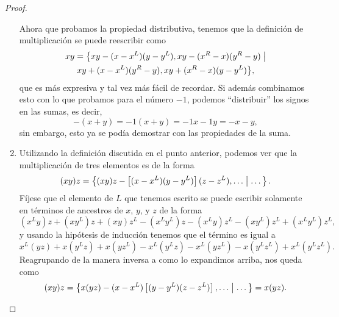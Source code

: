 \begin{proof}
\begin{enumerate}
            Ahora que probamos la propiedad distributiva, tenemos que la definici\'on de multiplicaci\'on se puede reescribir como 
            \begin{multline*}
                xy = \big\{xy-(x-x^L)(y-y^L),xy-(x^R-x)(y^R-y)\;\big|\\
                \break xy+(x-x^L)(y^R-y), xy+(x^R-x)(y-y^L)\big\},
            \end{multline*}
            que es m\'as expresiva y tal vez m\'as f\'acil de recordar. Si adem\'as combinamos esto con lo que probamos para el n\'umero $-1$, podemos ``distribuir'' los signos en las sumas, es decir,
            \[
                -(x+y) = -1(x+y) = -1x -1y = -x -y,
            \]
            sin embargo, esto ya se pod\'ia demostrar con las propiedades de la suma.
            \item Utilizando la definici\'on discutida en el punto anterior, podemos ver que la multiplicaci\'on de tres elementos es de la forma
            \[
                (xy)z = \left\{(xy)z - \left[(x-x^L)(y-y^L)\right] (z-z^L), \dots\;\middle|\; \dots\right\}.
            \]
            F\'ijese que el elemento de $L$ que tenemos escrito se puede escribir solamente en t\'erminos de ancestros de $x$, $y$, y $z$ de la forma
            \[
                (x^Ly)z + (xy^L)z + (xy)z^L - (x^Ly^L)z - (x^Ly)z^L - (xy^L)z^L + (x^Ly^L)z^L,
            \]
            y usando la hip\'otesis de inducci\'on tenemos que el t\'ermino es igual a
            \[
                x^L(yz) + x(y^Lz) + x(yz^L) - x^L(y^Lz) - x^L(yz^L) - x(y^Lz^L) + x^L(y^Lz^L).
            \]
            Reagrupando de la manera inversa a como lo expandimos arriba, nos queda como 
            \[
                (xy)z = \left\{x(yz) - (x-x^L)\left[(y-y^L)(z-z^L)\right], \dots\;\middle|\; \dots\right\} = x(yz).
            \]
        \end{enumerate}
    \end{proof}


